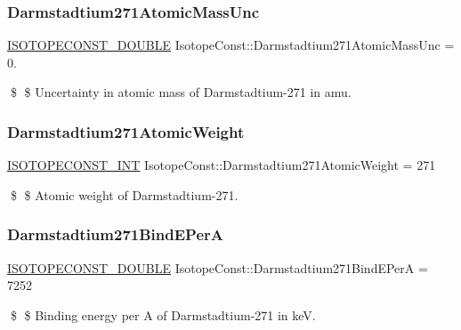 \subsubsection{\texorpdfstring{Darmstadtium271\+Atomic\+Mass\+Unc}{Darmstadtium271AtomicMassUnc}}
{\footnotesize\ttfamily \mbox{\hyperlink{group___isotope_const-_macros_ga8f45a7272ce02c0b4c65c44636ed719a}{I\+S\+O\+T\+O\+P\+E\+C\+O\+N\+S\+T\+\_\+\+D\+O\+U\+B\+LE}} Isotope\+Const\+::\+Darmstadtium271\+Atomic\+Mass\+Unc = 0.}

\$ \$ Uncertainty in atomic mass of Darmstadtium-\/271 in amu. \mbox{\label{group___isotope_const-_darmstadtium-_ds271_ga30d3cde4e607de388cc946525573835b}} 
\subsubsection{\texorpdfstring{Darmstadtium271\+Atomic\+Weight}{Darmstadtium271AtomicWeight}}
{\footnotesize\ttfamily \mbox{\hyperlink{group___isotope_const-_macros_ga5f18360b3e99483a35c32d789e62621c}{I\+S\+O\+T\+O\+P\+E\+C\+O\+N\+S\+T\+\_\+\+I\+NT}} Isotope\+Const\+::\+Darmstadtium271\+Atomic\+Weight = 271}

\$ \$ Atomic weight of Darmstadtium-\/271. \mbox{\label{group___isotope_const-_darmstadtium-_ds271_gaf1129c5e89a7e16aa22abd02b0456f40}} 
\subsubsection{\texorpdfstring{Darmstadtium271\+Bind\+E\+PerA}{Darmstadtium271BindEPerA}}
{\footnotesize\ttfamily \mbox{\hyperlink{group___isotope_const-_macros_ga8f45a7272ce02c0b4c65c44636ed719a}{I\+S\+O\+T\+O\+P\+E\+C\+O\+N\+S\+T\+\_\+\+D\+O\+U\+B\+LE}} Isotope\+Const\+::\+Darmstadtium271\+Bind\+E\+PerA = 7252}

\$ \$ Binding energy per A of Darmstadtium-\/271 in keV. \mbox{\label{group___isotope_const-_darmstadtium-_ds271_ga085962f7ef4c2b8bee94cb75bc615491}} 
